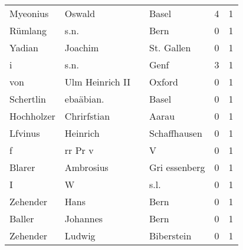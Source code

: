 \begin{tabular}{llllrr}
                 Myeonius &                             Oswald &             &                                       Basel &          4 &         1 \\
                  Rümlang &                               s.n. &             &                                        Bern &          0 &         1 \\
                   Yadian &                            Joachim &             &                                  St. Gallen &          0 &         1 \\
                        i &                               s.n. &             &                                        Genf &          3 &         1 \\
                      von &                    Ulm Heinrich II &             &                                      Oxford &          0 &         1 \\
                Schertlin &                          ebaäbian. &             &                                       Basel &          0 &         1 \\
               Hochholzer &                        Chrirfstian &             &                                       Aarau &          0 &         1 \\
                  Lfvinus &                           Heinrich &             &                                Schaffhausen &          0 &         1 \\
                        f &                            rr Pr v &             &                                           V &          0 &         1 \\
                   Blarer &                          Ambrosius &             &                               Gri essenberg &          0 &         1 \\
                        I &                                  W &             &                                        s.l. &          0 &         1 \\
                 Zehender &                               Hans &             &                                        Bern &          0 &         1 \\
                   Baller &                           Johannes &             &                                        Bern &          0 &         1 \\
                 Zehender &                             Ludwig &             &                                  Biberstein &          0 &         1 \\

\end{tabular}
